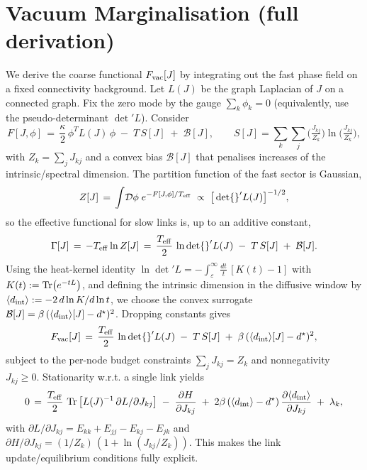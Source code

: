\documentclass[11pt]{article}
\begin{document}
\section{Vacuum Marginalisation (full derivation)}\label{si:vac-marg}
We derive the coarse functional $F_{\rm vac}[J]$ by integrating out the fast phase field on a fixed connectivity background. Let $L(J)$ be the graph Laplacian of $J$ on a connected graph. Fix the zero mode by the gauge $\sum_k \phi_k=0$ (equivalently, use the pseudo-determinant $\det{}'\!L$). Consider
\begin{equation}
  F[J,\phi] \,=\, \frac{\kappa}{2}\,\phi^T L(J)\,\phi \; -\; T\, S[J] \; +\; \mathcal B[J],\qquad S[J]=\sum_k\sum_j \Big(\tfrac{J_{kj}}{Z_k}\Big)\ln\Big(\tfrac{J_{kj}}{Z_k}\Big),
\end{equation}
with $Z_k=\sum_j J_{kj}$ and a convex bias $\mathcal B[J]$ that penalises increases of the intrinsic/spectral dimension. The partition function of the fast sector is Gaussian,
\begin{equation}
  Z[J] \,=\, \int \!\mathcal D\phi\; e^{-F[J,\phi]/T_{\rm eff}} \;\propto\; \big[\det{}' L(J)\big]^{-1/2},
\end{equation}
so the effective functional for slow links is, up to an additive constant,
\begin{equation}
  \Gamma[J] \,=\, -T_{\rm eff}\ln Z[J] \,=\, \frac{T_{\rm eff}}{2}\,\ln\det{}' L(J) \; -\; T\,S[J] \; +\; \mathcal B[J].
\end{equation}
Using the heat-kernel identity $\ln\det{}' L = -\int_{\varepsilon}^{\infty} \!\frac{dt}{t}\,[K(t)-1]$ with $K(t):=\Tr(e^{-tL})$, and defining the intrinsic dimension in the diffusive window by $\langle d_{\rm int}\rangle:=-2\,d\ln K/d\ln t$, we choose the convex surrogate $\mathcal B[J]=\beta\, (\langle d_{\rm int}\rangle[J]-d^\star)^2$. Dropping constants gives
\begin{equation}
  F_{\rm vac}[J] \,=\, \frac{T_{\rm eff}}{2}\,\ln\det{}' L(J) \; -\; T\,S[J] \; +\; \beta\,(\langle d_{\rm int}\rangle[J]-d^\star)^2,
\end{equation}
subject to the per-node budget constraints $\sum_j J_{kj}=Z_k$ and nonnegativity $J_{kj}\ge 0$. Stationarity w.r.t. a single link yields
\begin{equation}
  0 \,=\, \frac{T_{\rm eff}}{2}\,\Tr\big[ L(J)^{-1}\,\partial L/\partial J_{kj}\big] \; -\; \frac{\partial H}{\partial J_{kj}} \; +\; 2\beta\,(\langle d_{\rm int}\rangle-d^\star)\,\frac{\partial\langle d_{\rm int}\rangle}{\partial J_{kj}} \; +\; \lambda_k,
\end{equation}
with $\partial L/\partial J_{kj} = E_{kk}+E_{jj}-E_{kj}-E_{jk}$ and $\partial H/\partial J_{kj}=(1/Z_k)\,(1+\ln(J_{kj}/Z_k))$. This makes the link update/equilibrium conditions fully explicit.
\end{document}
